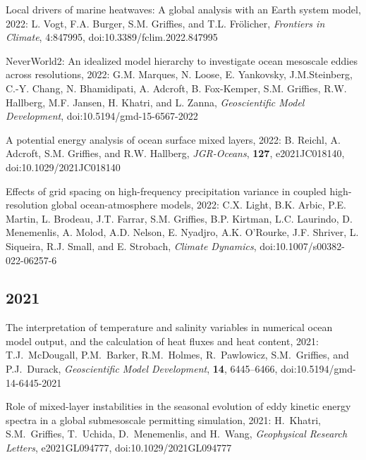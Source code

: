 \begin{etaremune}
\item Local drivers of marine heatwaves: A global analysis with an Earth system model, 2022: L. Vogt, F.A. Burger, S.M. Grif\/f\/ies, and T.L. {Fr\"{o}licher}, {\it Frontiers in Climate}, 4:847995, doi:10.3389/fclim.2022.847995

\item NeverWorld2: An idealized model hierarchy to investigate ocean mesoscale eddies across resolutions, 2022: G.M. Marques, N. Loose, E. Yankovsky, J.M.Steinberg, C.-Y. Chang, N. Bhamidipati, A. Adcroft, B. Fox-Kemper, S.M. Griffies, R.W. Hallberg, M.F. Jansen, H. Khatri, and L. Zanna, {\it Geoscientific Model Development}, doi:10.5194/gmd-15-6567-2022

\item A potential energy analysis of ocean surface mixed layers, 2022: B. Reichl, A. Adcroft, S.M. Grif\/f\/ies, and R.W. Hallberg, {\it JGR-Oceans}, {\bf 127}, e2021JC018140, doi:10.1029/2021JC018140

\item Effects of grid spacing on high-frequency precipitation variance in coupled high-resolution global ocean-atmosphere models, 2022: C.X. Light, B.K. Arbic, P.E. Martin, L. Brodeau, J.T. Farrar, S.M. Grif\/f\/ies, B.P. Kirtman, L.C. Laurindo,  D. Menemenlis, A. Molod, A.D. Nelson, E. Nyadjro, A.K. O'Rourke,  J.F. Shriver, L. Siqueira, R.J. Small, and E. Strobach, {\it Climate Dynamics}, doi:10.1007/s00382-022-06257-6


\subsection*{\sc \color{Maroon} 2021}

\item The interpretation of temperature and salinity variables in numerical ocean model output, and the calculation of heat fluxes and heat content, 2021: T.J.\ McDougall, P.M.\ Barker, R.M.\ Holmes, R.\ Pawlowicz, S.M.\ Grif\/f\/ies, and P.J.\ Durack, {\it Geoscientific Model Development}, {\bf 14}, 6445–6466, doi:10.5194/gmd-14-6445-2021



\item Role of mixed-layer instabilities in the seasonal evolution of eddy kinetic energy spectra in a global submesoscale permitting simulation, 2021: H.\ Khatri, S.M.\ Grif\/f\/ies, T.\ Uchida, D.\ Menemenlis, and H.\ Wang, {\it  Geophysical Research Letters}, e2021GL094777, doi:10.1029/2021GL094777


\end{etaremune}
